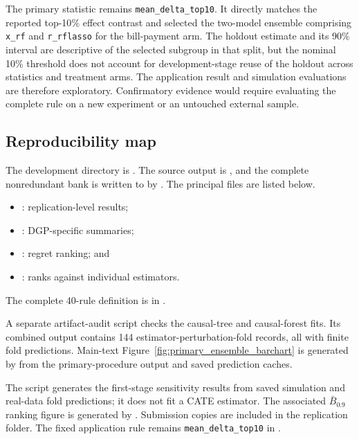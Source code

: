 \documentclass[12pt]{article}
\newcommand{\TargetFrac}{10{\%}\xspace}
\begin{document}
The primary statistic remains \texttt{mean\_delta\_top10}. It directly matches the reported top-\TargetFrac effect contrast and selected the two-model ensemble comprising \texttt{x\_rf} and \texttt{r\_rflasso} for the bill-payment arm. The holdout estimate and its 90\% interval are descriptive of the selected subgroup in that split, but the nominal 10\% threshold does not account for development-stage reuse of the holdout across statistics and treatment arms. The application result and simulation evaluations are therefore exploratory. Confirmatory evidence would require evaluating the complete rule on a new experiment or an untouched external sample.

\subsection{Reproducibility map}

The development directory is . The source output is , and the complete nonredundant bank is written to  by . The principal files are listed below.
\begin{itemize}
\item {}: replication-level results;
\item {}: DGP-specific summaries;
\item {}: regret ranking; and
\item {}: ranks against individual estimators.
\end{itemize}
The complete 40-rule definition is in .

A separate artifact-audit script checks the causal-tree and causal-forest fits. Its combined output contains 144 estimator-perturbation-fold records, all with finite fold predictions. Main-text Figure~\ref{fig:primary_ensemble_barchart} is generated by  from the primary-procedure output and saved prediction caches.

The script  generates the first-stage sensitivity results from saved simulation and real-data fold predictions; it does not fit a CATE estimator. The associated $\bar B_{0.9}$ ranking figure is generated by . Submission copies are included in the replication folder. The fixed application rule remains \texttt{mean\_delta\_top10} in .
\end{document}
